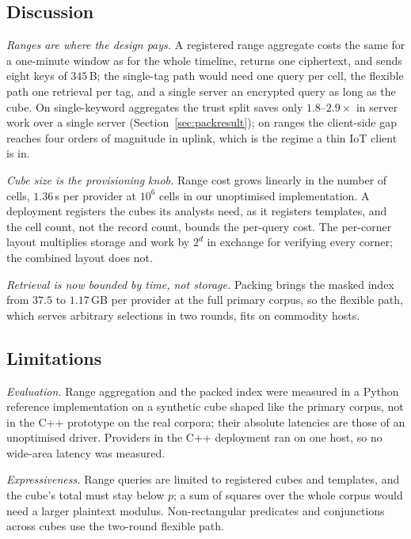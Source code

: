 \documentclass[a4paper,fleqn]{cas-sc}
\newif\ifauthorchecks
\newcommand{\authorcheck}[1]{\ifauthorchecks{\color{red}\textsf{[Authors: #1]}}\fi}
\begin{document}
\subsection{Discussion}
\emph{Ranges are where the design pays.} A registered range aggregate costs the
same for a one-minute window as for the whole timeline, returns one ciphertext,
and sends eight keys of $345$\,B; the single-tag path would need one query per
cell, the flexible path one retrieval per tag, and a single server an
encrypted query as long as the cube. On single-keyword aggregates the trust
split saves only $1.8$--$2.9\times$ in server work over a single server
(Section~\ref{sec:packresult}); on ranges the client-side gap reaches four
orders of magnitude in uplink, which is the regime a thin IoT client is in.

\emph{Cube size is the provisioning knob.} Range cost grows linearly in the
number of cells, $1.36$\,s per provider at $10^6$ cells in our unoptimised
implementation. A deployment registers the cubes its analysts need, as it
registers templates, and the cell count, not the record count, bounds the
per-query cost. The per-corner layout multiplies storage and work by $2^d$ in
exchange for verifying every corner; the combined layout does not.

\emph{Retrieval is now bounded by time, not storage.} Packing brings the masked
index from $37.5$ to $1.17$\,GB per provider at the full primary corpus, so the
flexible path, which serves arbitrary selections in two rounds, fits on
commodity hosts.

\subsection{Limitations}
\label{sec:limits}
\emph{Evaluation.} Range aggregation and the packed index were measured in a
Python reference implementation on a synthetic cube shaped like the primary
corpus, not in the C++ prototype on the real corpora; their absolute latencies
are those of an unoptimised driver. Providers in the C++ deployment ran on one
host, so no wide-area latency was measured. \authorcheck{Port range
aggregation to the C++ build, measure it on both real corpora, and run the
deployment with providers in at least two cloud regions.}

\emph{Expressiveness.} Range queries are limited to registered cubes and
templates, and the cube's total must stay below $p$; a sum of squares over the
whole corpus would need a larger plaintext modulus. Non-rectangular predicates
and conjunctions across cubes use the two-round flexible path.
\end{document}
